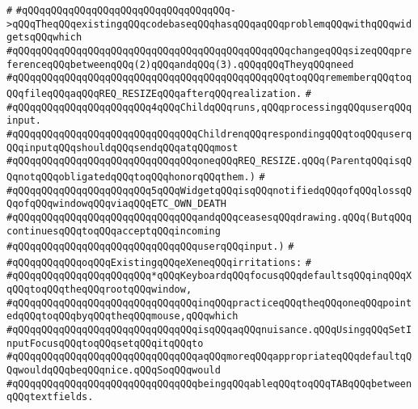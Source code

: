 \verb|#|\newline
\verb|#qQQqqQQqqQQqqQQqqQQqqQQqqQQqqQQqqQQq->qQQqTheqQQqexistingqQQqcodebaseqQQqhasqQQqaqQQqproblemqQQqwithqQQqwidgetsqQQqwhich|\newline
\verb|#qQQqqQQqqQQqqQQqqQQqqQQqqQQqqQQqqQQqqQQqqQQqqQQqchangeqQQqsizeqQQqpreferenceqQQqbetweenqQQq(2)qQQqandqQQq(3).qQQqqQQqTheyqQQqneed|\newline
\verb|#qQQqqQQqqQQqqQQqqQQqqQQqqQQqqQQqqQQqqQQqqQQqqQQqtoqQQqrememberqQQqtoqQQqfileqQQqaqQQqREQ_RESIZEqQQqafterqQQqrealization.|\newline
\verb|#|\newline
\verb|#qQQqqQQqqQQqqQQqqQQqqQQq4qQQqChildqQQqruns,qQQqprocessingqQQquserqQQqinput.|\newline
\verb|#qQQqqQQqqQQqqQQqqQQqqQQqqQQqqQQqChildrenqQQqrespondingqQQqtoqQQquserqQQqinputqQQqshouldqQQqsendqQQqatqQQqmost|\newline
\verb|#qQQqqQQqqQQqqQQqqQQqqQQqqQQqqQQqoneqQQqREQ_RESIZE.qQQq(ParentqQQqisqQQqnotqQQqobligatedqQQqtoqQQqhonorqQQqthem.)|\newline
\verb|#|\newline
\verb|#qQQqqQQqqQQqqQQqqQQqqQQq5qQQqWidgetqQQqisqQQqnotifiedqQQqofqQQqlossqQQqofqQQqwindowqQQqviaqQQqETC_OWN_DEATH|\newline
\verb|#qQQqqQQqqQQqqQQqqQQqqQQqqQQqqQQqandqQQqceasesqQQqdrawing.qQQq(ButqQQqcontinuesqQQqtoqQQqacceptqQQqincoming|\newline
\verb|#qQQqqQQqqQQqqQQqqQQqqQQqqQQqqQQquserqQQqinput.)|\newline
\verb|#|\newline
\verb|#qQQqqQQqqQQqoqQQqExistingqQQqeXeneqQQqirritations:|\newline
\verb|#|\newline
\verb|#qQQqqQQqqQQqqQQqqQQqqQQq*qQQqKeyboardqQQqfocusqQQqdefaultsqQQqinqQQqXqQQqtoqQQqtheqQQqrootqQQqwindow,|\newline
\verb|#qQQqqQQqqQQqqQQqqQQqqQQqqQQqqQQqinqQQqpracticeqQQqtheqQQqoneqQQqpointedqQQqtoqQQqbyqQQqtheqQQqmouse,qQQqwhich|\newline
\verb|#qQQqqQQqqQQqqQQqqQQqqQQqqQQqqQQqisqQQqaqQQqnuisance.qQQqUsingqQQqSetInputFocusqQQqtoqQQqsetqQQqitqQQqto|\newline
\verb|#qQQqqQQqqQQqqQQqqQQqqQQqqQQqqQQqaqQQqmoreqQQqappropriateqQQqdefaultqQQqwouldqQQqbeqQQqnice.qQQqSoqQQqwould|\newline
\verb|#qQQqqQQqqQQqqQQqqQQqqQQqqQQqqQQqbeingqQQqableqQQqtoqQQqTABqQQqbetweenqQQqtextfields.|\newline
